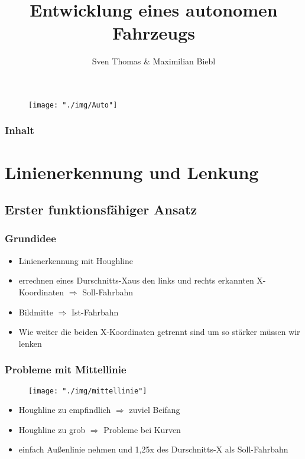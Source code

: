\documentclass{beamer}
\title[]{Entwicklung eines autonomen Fahrzeugs}
\author{Sven Thomas \& Maximilian Biebl}
\institute[THM]{Technische Hochschule Mittelhessen}
\date{}
\begin{document}
	\begin{frame}
		\begin{center}
				\begin{figure}[h]
					\texttt{[image: "./img/Auto"]}
					\label{fig:Auto}
				\end{figure}
		\end{center}
		\titlepage
			
	\end{frame}

	\begin{frame}
		\frametitle{Inhalt}
		\tableofcontents
	\end{frame}

	\section{Linienerkennung und Lenkung}
	

	\subsection{Erster funktionsfähiger Ansatz}

	\begin{frame}
		\frametitle{Grundidee}
	

		\begin{itemize}
			\item Linienerkennung mit Houghline
			\item errechnen eines \glqq Durschnitts-X\grqq aus den links und rechts erkannten X-Koordinaten $\Rightarrow$ Soll-Fahrbahn
			\item Bildmitte $\Rightarrow$ Ist-Fahrbahn
			\item Wie weiter die beiden X-Koordinaten getrennt sind um so stärker müssen wir lenken 
		\end{itemize}
	\end{frame}

	\begin{frame}
		\frametitle{Probleme mit Mittellinie}
		\begin{center}
			\begin{figure}[h]
				\texttt{[image: "./img/mittellinie"]}
				\label{fig:Mittellinie}
			\end{figure}
		\end{center}
		
		\begin{itemize}
			\item Houghline zu empfindlich $\Rightarrow$ zuviel \glqq Beifang\grqq 
			\item Houghline zu grob $\Rightarrow$ Probleme bei Kurven
			\item einfach Außenlinie nehmen und 1,25x des Durschnitts-X als Soll-Fahrbahn
		\end{itemize}
	\end{frame}
\end{document}
